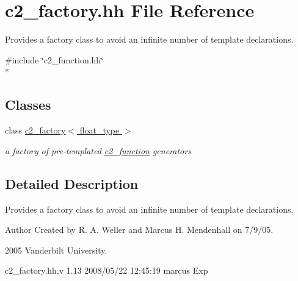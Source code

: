 \hypertarget{c2__factory_8hh}{\section{c2\-\_\-factory.\-hh File Reference}
\label{c2__factory_8hh}
}


Provides a factory class to avoid an infinite number of template declarations.  


{\ttfamily \#include \char`\"{}c2\-\_\-function.\-hh\char`\"{}}\\*
\subsection*{Classes}
\begin{DoxyCompactItemize}
\item 
class \hyperlink{classc2__factory}{c2\-\_\-factory$<$ float\-\_\-type $>$}
\begin{DoxyCompactList}\small\item\em a factory of pre-\/templated \hyperlink{classc2__function}{c2\-\_\-function} generators \end{DoxyCompactList}\end{DoxyCompactItemize}


\subsection{Detailed Description}
Provides a factory class to avoid an infinite number of template declarations. \begin{DoxyAuthor}{Author}
Created by R. A. Weller and Marcus H. Mendenhall on 7/9/05. 

2005 Vanderbilt University. \begin{DoxyVerb}   \version c2_factory.hh,v 1.13 2008/05/22 12:45:19 marcus Exp\end{DoxyVerb}

\end{DoxyAuthor}
